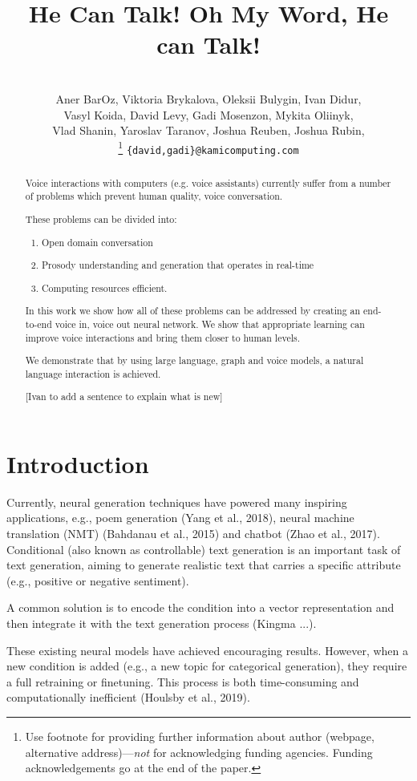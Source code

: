 \documentclass[11pt,a4paper]{article}
\title{He Can Talk! Oh My Word, He can Talk!}
\author{\\
  Aner BarOz, Viktoria Brykalova, Oleksii Bulygin, Ivan Didur,\\
Vasyl Koida, David Levy, Gadi Mosenzon, Mykita Oliinyk,\\ 
Vlad Shanin, Yaroslav Taranov, Joshua Reuben, Joshua Rubin,\\
\thanks{ Use footnote for providing further information about author (webpage, alternative address)---\emph{not} for acknowledging funding agencies.  Funding acknowledgements go at the end of the paper.}    
\texttt{\{david,gadi\}@kamicomputing.com} \\
}
\begin{document}
\maketitle

\begin{abstract}

Voice interactions with computers (e.g. voice assistants) currently suffer from a number of problems which prevent human quality, voice conversation.

These problems can be divided into:
\begin{enumerate} %
  \item Open domain conversation  
  \item Prosody understanding and generation that operates in real-time
  \item Computing resources efficient. 
\end{enumerate}

In this work we show how all of these problems can be addressed by creating an end-to-end voice in, voice out neural network. We show that appropriate learning can improve voice interactions and bring them closer to human levels. 

We demonstrate that by using large language, graph and voice models, a natural language interaction is achieved. 

[Ivan to add a sentence to explain what is new]
\end{abstract}

\section{Introduction}
Currently, neural generation techniques have powered many inspiring applications, e.g., poem generation (Yang et al., 2018), neural machine translation
(NMT) (Bahdanau et al., 2015) and chatbot (Zhao
et al., 2017). Conditional (also known as controllable) text generation is an important task of text
generation, aiming to generate realistic text that
carries a specific attribute (e.g., positive or negative
sentiment). 

A common solution is to encode the
condition into a vector representation and then integrate it with the text generation process (Kingma ...).

These existing neural models have achieved
encouraging results. However, when a new condition is added (e.g., a new topic for categorical
generation), they require a full retraining or finetuning. This process is both time-consuming and
computationally inefficient (Houlsby et al., 2019).
\end{document}
